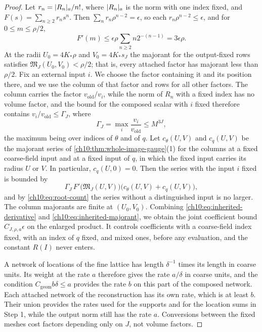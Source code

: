 \begin{proof}
Let $r_n=\lvert R_n\rvert_a/n!$, where $\lvert R_n\rvert_a$ is the norm with one index fixed, and $F(s)=\sum_{n\ge2}r_ns^n$. Then $\sum_nr_n\rho^{n-2}=\epsilon$, so each $r_n\rho^{n-2}\le\epsilon$, and for $0\le m\le\rho/2$,
\begin{equation}\label{ch10:eq:inherited-derivative}
 F'(m)\le\epsilon\rho\sum_{n\ge2}n2^{-(n-1)}=3\epsilon\rho.
\end{equation}
At the radii $U_0=4K_*\rho$ and $V_0=4K_*s_J$ the majorant for the output-fixed rows satisfies $\mathfrak M_J(U_0,V_0)<\rho/2$; that is, every attached factor has majorant less than $\rho/2$. Fix an external input $i$. We choose the factor containing it and its position there, and we use the column of that factor and rows for all other factors. The column carries the factor $v_{\mathrm{old}}/v_i$, while the norm of $R_n$ with a fixed index has no volume factor, and the bound for the composed scalar with $i$ fixed therefore contains $v_i/v_{\mathrm{old}}\le\Gamma_J$, where
\[
 \Gamma_J=\max_{i}\frac{v_i}{v_{\mathrm{old}}}\le M^{3J},
\]
the maximum being over indices of $\theta$ and of $q$. Let $c_\theta(U,V)$ and $c_q(U,V)$ be the majorant series of \cref{ch10:thm:whole-image-gauge}(1) for the columns at a fixed coarse-field input and at a fixed input of $q$, in which the fixed input carries its radius $U$ or $V$. In particular, $c_q(U,0)=0$. Then the series with the input $i$ fixed is bounded by
\begin{equation}\label{ch10:eq:inherited-majorant}
 \Gamma_J\,F'\bigl(\mathfrak M_J(U,V)\bigr)\bigl(c_\theta(U,V)+c_q(U,V)\bigr),
\end{equation}
and by \eqref{ch10:eq:root-count} the series without a distinguished input is no larger. The column majorants are finite at $(U_0,V_0)$. Combining \eqref{ch10:eq:inherited-derivative} and \eqref{ch10:eq:inherited-majorant}, we obtain the joint coefficient bound $C_{J,\rho,a}\epsilon$ on the enlarged product. It controls coefficients with a coarse-field index fixed, with an index of $q$ fixed, and mixed ones, before any evaluation, and the constant $R(I)$ never enters.

A network of locations of the fine lattice has length $\delta^{-1}$ times its length in coarse units. Its weight at the rate $a$ therefore gives the rate $a/\delta$ in coarse units, and the condition $C_{\mathrm{geom}}b\delta\le a$ provides the rate $b$ on this part of the composed network. Each attached network of the reconstruction has its own rate, which is at least $b$. Their union provides the rates used for the supports and for the location sums in Step 1, while the output norm still has the rate $a$. Conversions between the fixed meshes cost factors depending only on $J$, not volume factors.


\end{proof}
